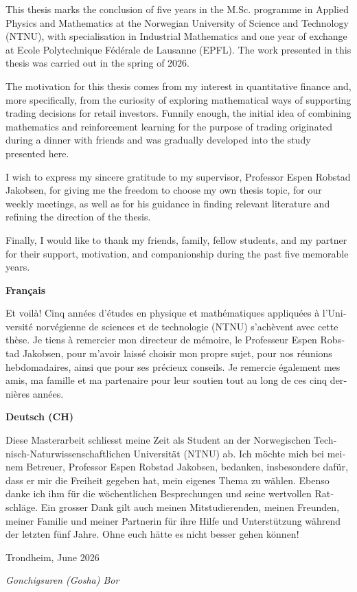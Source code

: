 This thesis marks the conclusion of five years in the M.Sc. programme in Applied Physics and Mathematics at the Norwegian University of Science and Technology (NTNU), with specialisation in Industrial Mathematics and one year of exchange at Ecole Polytechnique Fédérale de Lausanne (EPFL). The work presented in this thesis was carried out in the spring of 2026.

\noindent
The motivation for this thesis comes from my interest in quantitative finance and, more specifically, from the curiosity of exploring mathematical ways of supporting trading decisions for retail investors. Funnily enough, the initial idea of combining mathematics and reinforcement learning for the purpose of trading originated during a dinner with friends and was gradually developed into the study presented here. 

\noindent
I wish to express my sincere gratitude to my supervisor, Professor Espen Robstad Jakobsen, for giving me the freedom to choose my own thesis topic, for our weekly meetings, as well as for his guidance in finding relevant literature and refining the direction of the thesis.

\noindent
Finally, I would like to thank my friends, family, fellow students, and my partner for their support, motivation, and companionship during the past five memorable years.

\vspace{1.5em}

\begin{otherlanguage}{french}
\noindent\textbf{Français}

\medskip

\noindent
Et voilà! Cinq années d'études en physique et mathématiques appliquées à l'Université norvégienne de sciences et de technologie (NTNU) s'achèvent avec cette thèse. Je tiens à remercier mon directeur de mémoire, le Professeur Espen Robstad Jakobsen, pour m'avoir laissé choisir mon propre sujet, pour nos réunions hebdomadaires, ainsi que pour ses précieux conseils. Je remercie également mes amis, ma famille et ma partenaire pour leur soutien tout au long de ces cinq dernières années.
\end{otherlanguage}

\vspace{1.5em}

\begin{otherlanguage}{nswissgerman}
\noindent\textbf{Deutsch (CH)}

\medskip

\noindent
Diese Masterarbeit schliesst meine Zeit als Student an der Norwegischen Technisch-Naturwissenschaftlichen Universität (NTNU) ab. Ich möchte mich bei meinem Betreuer, Professor Espen Robstad Jakobsen, bedanken, insbesondere dafür, dass er mir die Freiheit gegeben hat, mein eigenes Thema zu wählen. Ebenso danke ich ihm für die wöchentlichen Besprechungen und seine wertvollen Ratschläge. Ein grosser Dank gilt auch meinen Mitstudierenden, meinen Freunden, meiner Familie und meiner Partnerin für ihre Hilfe und Unterstützung während der letzten fünf Jahre. Ohne euch hätte es nicht besser gehen können!
\end{otherlanguage}

\vspace{3em}

\noindent
Trondheim, June 2026

\kern -4pt

\noindent
\textit{Gonchigsuren (Gosha) Bor}
